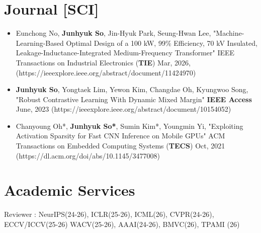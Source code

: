 \documentclass[a4paper,20pt]{article}
\begin{document}
\section{Journal [SCI]}
\begin{itemize}
    \item Eunchong No, \textbf{Junhyuk So}, Jin-Hyuk Park, Seung-Hwan Lee, "Machine-Learning-Based Optimal Design of a 100 kW, 99\% Efficiency, 70 kV Insulated, Leakage-Inductance-Integrated Medium-Frequency Transformer" IEEE Transactions on Industrial Electronics (\textbf{TIE}) Mar, 2026, (https://ieeexplore.ieee.org/abstract/document/11424970)
    \item  \textbf{Junhyuk So}, Yongtaek Lim, Yewon Kim, Changdae Oh, Kyungwoo Song, "Robust Contrastive Learning With Dynamic Mixed Margin" \textbf{IEEE Access} June, 2023 (https://ieeexplore.ieee.org/abstract/document/10154052)
\item Chanyoung Oh*, \textbf{Junhyuk So*}, Sumin Kim*, Youngmin Yi, "Exploiting Activation Sparsity for Fast CNN Inference on Mobile GPUs" ACM Transactions on Embedded Computing Systems (\textbf{TECS})  Oct, 2021 (https://dl.acm.org/doi/abs/10.1145/3477008)
\end{itemize}

\section{Academic Services}
\begin{description}[font=$\bullet$]
\item {Reviewer : NeurIPS(24-26), ICLR(25-26), ICML(26), CVPR(24-26), ECCV/ICCV(25-26) WACV(25-26), AAAI(24-26), BMVC(26), TPAMI (26) }
\end{description}

\end{document}
